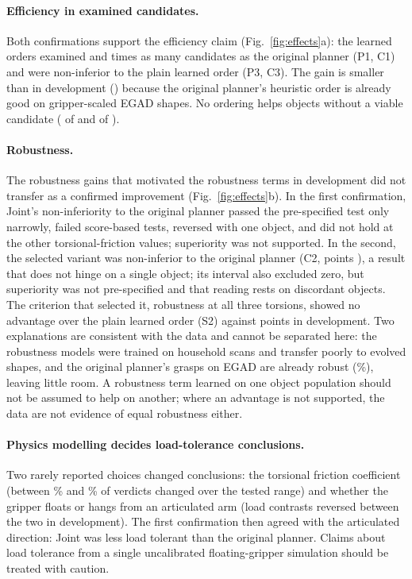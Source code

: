 \paragraph{Efficiency in examined candidates.} Both confirmations support the efficiency claim (Fig.~\ref{fig:effects}a): the learned orders examined \confPoneRatio{} and \nxConeEff{} times as many candidates as the original planner (P1, C1) and were non-inferior to the plain learned order (P3, C3). The gain is smaller than in development (\devPoneRatio) because the original planner's heuristic order is already good on gripper-scaled EGAD shapes. No ordering helps objects without a viable candidate (\confNonViable{} of \confObjects{} and \nxNoViable{} of \nxObjects{}).

\paragraph{Robustness.} The robustness gains that motivated the robustness terms in development did not transfer as a confirmed improvement (Fig.~\ref{fig:effects}b). In the first confirmation, Joint's non-inferiority to the original planner passed the pre-specified test only narrowly, failed score-based tests, reversed with one object, and did not hold at the other torsional-friction values; superiority was not supported. In the second, the selected variant was non-inferior to the original planner (C2, \nxCtwoEff{} points \nxCtwoCI), a result that does not hinge on a single object; its interval also excluded zero, but superiority was not pre-specified and that reading rests on \nxCtwoFav{} discordant objects. The criterion that selected it, robustness at all three torsions, showed no advantage over the plain learned order (S2) against \vAdv{} points in development. Two explanations are consistent with the data and cannot be separated here: the robustness models were trained on household scans and transfer poorly to evolved shapes, and the original planner's grasps on EGAD are already robust (\nxRobMzero\%), leaving little room. A robustness term learned on one object population should not be assumed to help on another; where an advantage is not supported, the data are not evidence of equal robustness either.

\paragraph{Physics modelling decides load-tolerance conclusions.} Two rarely reported choices changed conclusions: the torsional friction coefficient (between \devFlipHigh\% and \devFlipLow\% of verdicts changed over the tested range) and whether the gripper floats or hangs from an articulated arm (load contrasts reversed between the two in development). The first confirmation then agreed with the articulated direction: Joint was less load tolerant than the original planner. Claims about load tolerance from a single uncalibrated floating-gripper simulation should be treated with caution.

